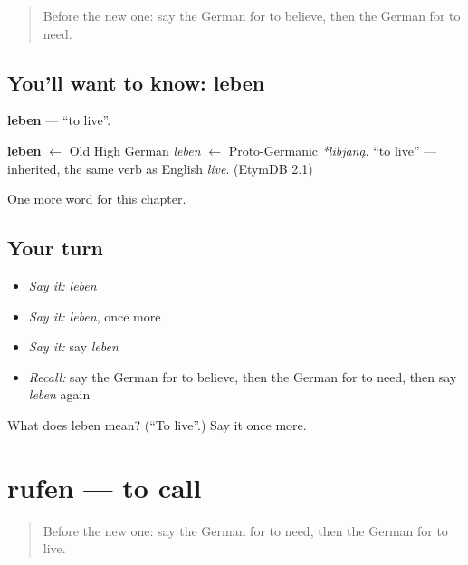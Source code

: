 \label{lesson:GE-C67-leben}



\begin{quote}
Before the new one: say the German for to believe, then the German for to need.
\end{quote}

\subsection*{You'll want to know: leben}
\textbf{leben} — \textquotedblleft{}to live\textquotedblright{}.

\begin{cousinweb}
\textbf{leben} $\leftarrow$ Old High German \emph{lebēn} $\leftarrow$ Proto-Germanic \emph{*libjaną}, \textquotedblleft{}to live\textquotedblright{} — inherited, the same verb as English \emph{live}. (EtymDB 2.1)
\end{cousinweb}

\begin{grammarlens}[title={What you've built}]
One more word for this chapter.
\end{grammarlens}

\subsection*{Your turn}
\begin{itemize}
\raggedright
  \item \emph{Say it:} \emph{leben}
  \item \emph{Say it:} \emph{leben}, once more
  \item \emph{Say it:} say \emph{leben}
  \item \emph{Recall:} say the German for to believe, then the German for to need, then say \emph{leben} again
\end{itemize}

\begin{tcolorbox}[breakable,colback=teal!4,colframe=teal!35!black,title={Before you move on}]
What does leben mean? (\textquotedblleft{}To live\textquotedblright{}.) Say it once more.
\end{tcolorbox}
\section[rufen]{rufen — to call}

\label{lesson:GE-C67-rufen}



\begin{quote}
Before the new one: say the German for to need, then the German for to live.
\end{quote}

